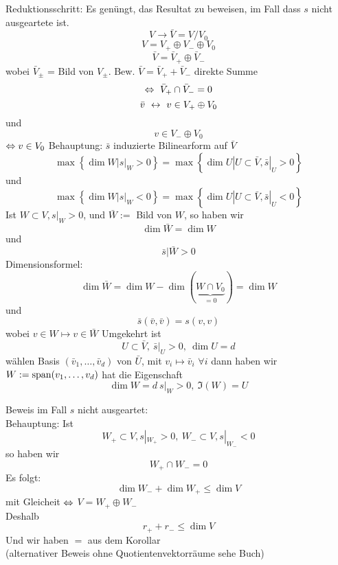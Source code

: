 \begin{Bew}
  Reduktionsschritt: Es genüngt, das Resultat zu beweisen, im Fall dass $s$ nicht ausgeartete ist.
  \[V\to\bar V=V/V_0\]
  \[V=V_+\oplus V_- \oplus V_0\]
  \[\bar V=\bar V_+\oplus \bar V_-\]
  wobei $\bar V_\pm$ = Bild von $V_\pm$. Bew. $\bar V=\bar V_++\bar V_-$ direkte Summe 
  \[\Leftrightarrow\ \bar V_+\cap \bar V_-=0\]
  \[\bar v\ \leftrightarrow\ v\in V_+\oplus V_0\]
  und
  \[v\in V_-\oplus V_0\]
  $\Leftrightarrow v\in V_0$
  Behauptung:
  $\bar s$ induzierte Bilinearform auf $\bar V$
  \[\max \left\{ \dim W| s|_W>0 \right\} = \max \left\{ \dim U | U\subset \bar V, \bar s|_U>0 \right\}\]
  und
  \[\max \left\{ \dim W| s|_W<0 \right\} = \max \left\{ \dim U | U\subset \bar V, \bar s|_U<0 \right\}\]
  Ist $W\subset V, s|_W>0$, und $\bar W:=$ Bild von $W$, so haben wir
  \[\dim\bar W=\dim W\]
  und
  \[\bar s|\bar W>0\]
  Dimensionsformel: 
  \[\dim \bar W=\dim W-\dim(\underbrace{W\cap V_0}_{=0})=\dim W\]
  und
  \[\bar s(\bar v,\bar v)=s(v,v)\]
  wobei $v\in W \mapsto v\in \bar W$
  Umgekehrt ist
  \[U\subset\bar V,\ \bar s|_U>0,\ \dim U=d\]
  wählen Basis $(\bar v_1,\dots,\bar v_d)$ von $\bar U$, mit $v_i\mapsto\bar v_i$ $\forall i$ dann haben wir $W:=\operatorname{span}(v_1,\dots,v_d)$ hat die Eigenschaft
  \[\dim W=d\ s|_W>0,\ \Im(W)=U\]

  Beweis im Fall $s$ nicht ausgeartet:\\
  Behauptung: Ist
  \[W_+\subset V,s|_{W_+}>0,\ W_-\subset V,s|_{W_-}<0\]
  so haben wir
  \[W_+\cap W_-=0\]
  Es folgt:
  \[\dim W_- + \dim W_+ \leq \dim V\]
  mit Gleicheit $\Leftrightarrow$ $V=W_+\oplus W_-$\\
  Deshalb
  \[r_++r_- \leq \dim V\]
  Und wir haben $=$ aus dem Korollar\\
  (alternativer Beweis ohne Quotientenvektorräume sehe Buch)\\
\end{Bew}
